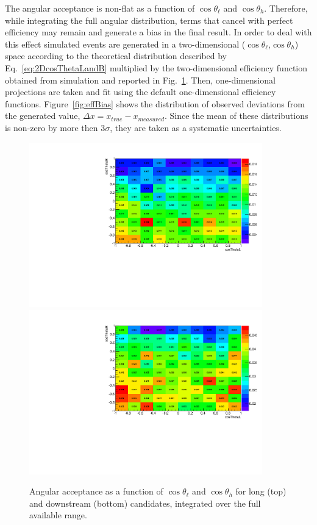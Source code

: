 The angular acceptance is non-flat as a function of $\cos\theta_\ell$ and $\cos \theta_h$.
Therefore, while integrating the full angular distribution, terms that cancel with perfect efficiency
may remain and generate a bias in the final result. In order to deal with this effect simulated events are
generated in a two-dimensional ($\cos\theta_\ell$,$\cos \theta_h$) space according to the
theoretical distribution described by Eq.~\ref{eq:2DcosThetaLandB} multiplied by the two-dimensional
efficiency function obtained from simulation and reported in Fig.~\ref{fig:2DcosThetaLandBeff}.
Then, one-dimensional projections are taken and fit using the default one-dimensional efficiency functions.
Figure~\ref{fig:effBias} shows the distribution of observed deviations from the generated 
value, $\Delta x = x_{true} - x_{measured}$.
Since the mean of these distributions is non-zero by more then 3$\sigma$, they are taken as a systematic uncertainties.
%
\begin{figure}[h!]
\includegraphics[width=0.9\textwidth]{Lmumu/figs/efficiencies/2D/2Deff_upper_cosThetaB_vs_cosThetaL_DD.pdf}
\includegraphics[width=0.9\textwidth]{Lmumu/figs/efficiencies/2D/2Deff_upper_cosThetaB_vs_cosThetaL_LL.pdf}
\caption{Angular acceptance as a function of $\cos\theta_\ell$ and $\cos\theta_h$ for long (top) and
downstream (bottom) candidates, integrated over the full available \qsq range.}
\label{fig:2DcosThetaLandBeff}
\end{figure}
